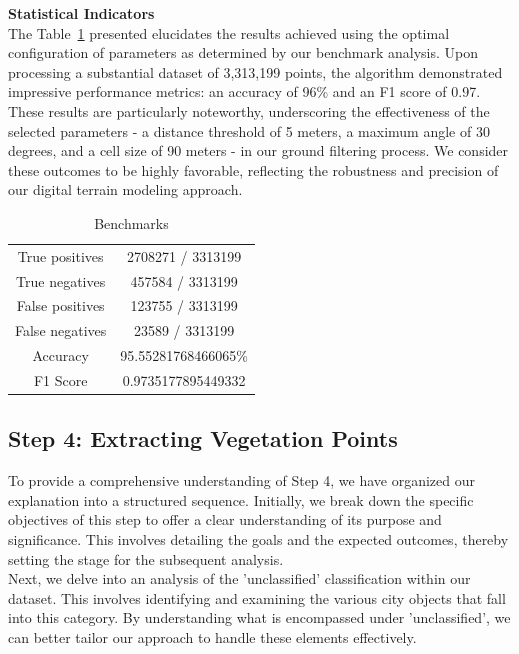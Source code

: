 \documentclass{article}
\begin{document}
\noindent \textbf{Statistical Indicators}\\
The Table~\ref{table3} presented elucidates the results achieved using the optimal configuration of parameters as determined by our benchmark analysis. Upon processing a substantial dataset of 3,313,199 points, the algorithm demonstrated impressive performance metrics: an accuracy of 96\% and an F1 score of 0.97. These results are particularly noteworthy, underscoring the effectiveness of the selected parameters - a distance threshold of 5 meters, a maximum angle of 30 degrees, and a cell size of 90 meters - in our ground filtering process. We consider these outcomes to be highly favorable, reflecting the robustness and precision of our digital terrain modeling approach.


\begin{table}[H]
    \centering
    \caption{Benchmarks}
    \small
    \begin{tabular}{c|c}
         \hline
         True positives & 2708271 / 3313199\\
         True negatives & 457584 / 3313199\\
         False positives & 123755 / 3313199\\
         False negatives& 23589 / 3313199\\
         Accuracy & 95.55281768466065\% \\
         F1 Score & 0.9735177895449332\\
         \hline
    \end{tabular}
    \label{table3}
\end{table}

\subsection{Step 4: Extracting Vegetation Points}\label{step4}
To provide a comprehensive understanding of Step 4, we have organized our explanation into a structured sequence. Initially, we break down the specific objectives of this step to offer a clear understanding of its purpose and significance. This involves detailing the goals and the expected outcomes, thereby setting the stage for the subsequent analysis.\\

\noindent Next, we delve into an analysis of the 'unclassified' classification within our dataset. This involves identifying and examining the various city objects that fall into this category. By understanding what is encompassed under 'unclassified', we can better tailor our approach to handle these elements effectively.\\
\end{document}
